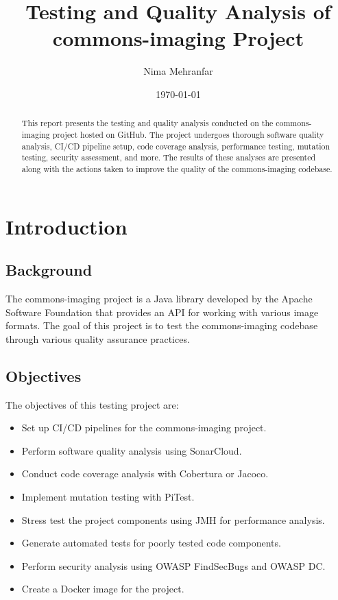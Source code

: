 \documentclass[a4paper,12pt]{report}
\title{Testing and Quality Analysis of commons-imaging Project}
\author{Nima Mehranfar}
\date{\today}
\begin{document}
\maketitle

\begin{abstract}
    This report presents the testing and quality analysis conducted on the commons-imaging project hosted on GitHub. The project undergoes thorough software quality analysis, CI/CD pipeline setup, code coverage analysis, performance testing, mutation testing, security assessment, and more. The results of these analyses are presented along with the actions taken to improve the quality of the commons-imaging codebase.
\end{abstract}

\tableofcontents
\newpage

\chapter{Introduction}
\section{Background}
The commons-imaging project is a Java library developed by the Apache Software Foundation that provides an API for working with various image formats. The goal of this project is to test the commons-imaging codebase through various quality assurance practices.

\section{Objectives}
The objectives of this testing project are:
\begin{itemize}
    \item Set up CI/CD pipelines for the commons-imaging project.
    \item Perform software quality analysis using SonarCloud.
    \item Conduct code coverage analysis with Cobertura or Jacoco.
    \item Implement mutation testing with PiTest.
    \item Stress test the project components using JMH for performance analysis.
    \item Generate automated tests for poorly tested code components.
    \item Perform security analysis using OWASP FindSecBugs and OWASP DC.
    \item Create a Docker image for the project.
\end{itemize}
\end{document}
